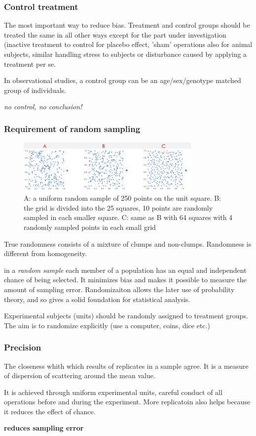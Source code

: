 \documentclass{article}
\begin{document}
\subsubsection{Control treatment}
The most important way to reduce bias. Treatment and control groups should be treated the same in all other ways except for the part under investigation (inactive treatment to control for placebo effect, 'sham' operations also for animal subjects, similar handling stress to subjects or disturbance caused by applying a treatment per se. \par 
In observational studies, a control group can be an age/sex/genotype matched group of individuals.
\begin{center}
\textit{no control, no conclusion!}
\end{center}

\subsubsection{Requirement of random sampling}
\begin{figure}[h]
\centering
\includegraphics[width = 0.8\textwidth]{exp-design/random-sampling.png}
\caption{A: a uniform random sample of 250 points on the unit square. B: the grid is divided into the 25 squares, 10 points are randomly sampled in each smaller square. C: same as B with 64 squares with 4 randomly sampled points in each small grid}
\end{figure}
True randomness consists of a mixture of clumps and non-clumps. Randomness is different from homogeneity.\par 
in a \textit{random sample} each member of a population has an equal and independent chance of being selected. It minimizes bias and makes it possible to measure the amount of sampling error. Randomizaiton allows the later use of probability theory, and so gives a solid foundation for statistical analysis.\par 
Experimental subjects (units) should be randomly assigned to treatment groups. The aim is to randomize explicitly (use a computer, coins, dice etc.) 
\subsubsection{Precision}
The closeness whith which results of replicates in a sample agree. It is a measure of dispersion of scattering around the mean value. \par 
It is achieved through uniform experimental units, careful conduct of all operations before and during the experiment. More replicatoin also helps because it reduces the effect of chance.\par
\textbf{reduces sampling error}
\end{document}

